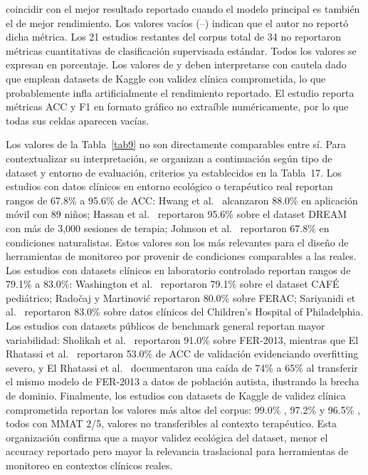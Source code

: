 \documentclass[3p,twocolumn,times]{elsarticle}
\begin{document}
\begin{table}[t]
\begin{minipage}{\textwidth}
			coincidir con el mejor resultado reportado cuando el modelo principal es también el
			de mejor rendimiento. Los valores vacíos (--) indican que el autor no reportó dicha
			métrica. Los 21 estudios restantes del corpus total de 34 no reportaron métricas
			cuantitativas de clasificación supervisada estándar. Todos los valores se expresan
			en porcentaje. Los valores de \cite{Aljbori2025} y \cite{Hosney2024} deben
			interpretarse con cautela dado que emplean datasets de Kaggle con validez clínica
			comprometida, lo que probablemente infla artificialmente el rendimiento reportado.
			El estudio \cite{Rudovic2019} reporta métricas ACC y F1 en formato gráfico no
			extraíble numéricamente, por lo que todas sus celdas aparecen vacías.
		\end{minipage}
	\end{table}
	
	Los valores de la Tabla~\ref{tab9} no son directamente comparables entre sí. Para
	contextualizar su interpretación, se organizan a continuación según tipo de dataset
	y entorno de evaluación, criterios ya establecidos en la Tabla~17. Los estudios con
	datos clínicos en entorno ecológico o terapéutico real reportan rangos de 67.8\% a
	95.6\% de ACC: Hwang et al.\ \cite{Hwang2024} alcanzaron 88.0\% en aplicación
	móvil con 89 niños; Hassan et al.\ \cite{Hassan2025} reportaron 95.6\% sobre el
	dataset DREAM con más de 3{,}000 sesiones de terapia; Johnson et al.\
	\cite{Johnson2025} reportaron 67.8\% en condiciones naturalistas. Estos valores son
	los más relevantes para el diseño de herramientas de monitoreo por provenir de
	condiciones comparables a las reales. Los estudios con datasets clínicos en
	laboratorio controlado reportan rangos de 79.1\% a 83.0\%: Washington et al.\
	\cite{Washington2022} reportaron 79.1\% sobre el dataset CAFÉ pediátrico; Radočaj
	y Martinović \cite{Radocaj2025} reportaron 80.0\% sobre FERAC; Sariyanidi et al.\
	\cite{Sariyanidi2025} reportaron 83.0\% sobre datos clínicos del Children's
	Hospital of Philadelphia. Los estudios con datasets públicos de benchmark general
	reportan mayor variabilidad: Sholikah et al.\ \cite{Sholikah2024} reportaron 91.0\%
	sobre FER-2013, mientras que El Rhatassi et al.\ \cite{Rhatassi2025} reportaron
	53.0\% de ACC de validación evidenciando overfitting severo, y El Rhatassi et al.\
	\cite{Rhatassi2024} documentaron una caída de 74\% a 65\% al transferir el mismo
	modelo de FER-2013 a datos de población autista, ilustrando la brecha de dominio.
	Finalmente, los estudios con datasets de Kaggle de validez clínica comprometida
	reportan los valores más altos del corpus: 99.0\% \cite{Aljbori2025}, 97.2\%
	\cite{Hosney2024} y 96.5\% \cite{Ramachandran2025}, todos con MMAT 2/5, valores no
	transferibles al contexto terapéutico. Esta organización confirma que a mayor
	validez ecológica del dataset, menor el accuracy reportado pero mayor la relevancia
	traslacional para herramientas de monitoreo en contextos clínicos reales.
	
\end{document}
